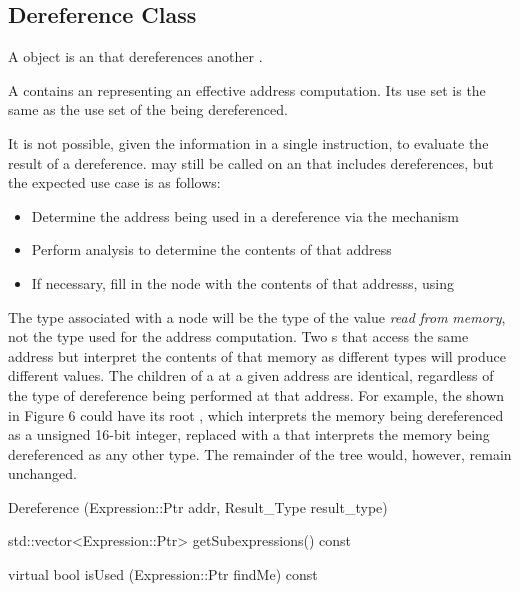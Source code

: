 \subsection{Dereference Class}
\label{sec:dereference}

A  object is an  that dereferences another
.

A  contains an  representing an effective address
computation. Its use set is the same as the use set of the  being
dereferenced.

It is not possible, given the information in a single instruction, to evaluate the
result of a dereference.  may still be called on an 
that includes dereferences, but the expected use case is as follows:

\begin{itemize}
\item Determine the address being used in a dereference via the  mechanism
\item Perform analysis to determine the contents of that address
\item If necessary, fill in the  node with the contents of that addresss, using  
\end{itemize}

The type associated with a  node will be the type of the value
{\itshape read\/} {\itshape from\/} {\itshape memory\/}, not the type used for
the address computation. Two s that access the same address but
interpret the contents of that memory as different types will produce different values.
The children of a  at a given address are identical,
regardless of the type of dereference being performed at that address. For example,
the  shown in Figure 6 could have its root , which
interprets the memory being dereferenced as a unsigned 16-\/bit integer, replaced
with a  that interprets the memory being dereferenced as any
other type. The remainder of the  tree would, however, remain
unchanged.

\begin{apient}
Dereference (Expression::Ptr addr, Result_Type result_type)
\end{apient}

\begin{apient}
std::vector<Expression::Ptr> getSubexpressions() const
\end{apient}

\begin{apient}
virtual bool isUsed (Expression::Ptr findMe) const
\end{apient}
